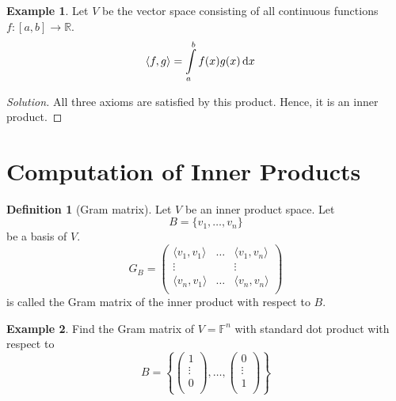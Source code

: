 \documentclass[fleqn, a4paper, 12pt]{article}
\theoremstyle{definition}
\newtheorem{example}{Example} %
\newtheorem{definition}{Definition} %
\theoremstyle{theorem}
\theoremstyle{remark}
\newenvironment{solution} %
	{\begin{proof}[Solution]\let\qed\relax}
	{\end{proof}}
\numberwithin{corollary}{theorem}
\numberwithin{equation}{theorem}
\begin{document}
\begin{example}
	Let $V$ be the vector space consisting of all continuous functions $f : [a , b] \to \mathbb{R}$.
	\begin{align*}
		\langle f, g \rangle &= \int\limits_{a}^{b} f(x) g(x) \dif x
	\end{align*}
\end{example}

\begin{solution}
	All three axioms are satisfied by this product. Hence, it is an inner product.
\end{solution}

\section{Computation of Inner Products}

\begin{definition}[Gram matrix]
	Let $V$ be an inner product space. Let 
	\begin{equation*}
		B = \{v_1, \dots, v_n\}
	\end{equation*}
	be a basis of $V$.
	\begin{equation*}
		G_B = 
			\begin{pmatrix}
				\langle v_1, v_1 \rangle & \dots & \langle v_1, v_n \rangle\\
				\vdots & & \vdots\\
				\langle v_n, v_1 \rangle & \dots & \langle v_n, v_n \rangle\\
			\end{pmatrix}
	\end{equation*}
	is called the Gram matrix of the inner product with respect to $B$.
\end{definition}

\begin{example}
	Find the Gram matrix of $V = \mathbb{F}^n$ with standard dot product with respect to 
	\begin{equation*}
		B = 
			\left\lbrace
				\begin{pmatrix}
					1\\
					\vdots\\
					0\\
				\end{pmatrix}
				,
				\dots
				,
				\begin{pmatrix}
					0\\
					\vdots\\
					1\\
				\end{pmatrix}
			\right\rbrace
	\end{equation*}
\end{example}
\end{document}
